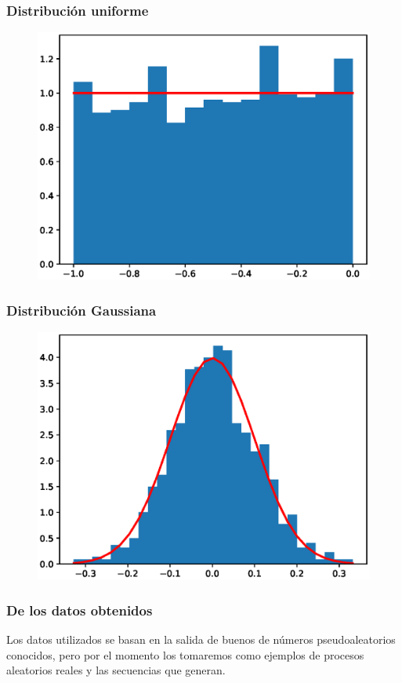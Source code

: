 \documentclass[12pt]{beamer}
\begin{document}
\begin{frame}
\frametitle{Distribución uniforme}
\begin{figure}
    \centering
    \includegraphics[scale=0.55]{Imagenes/plot_distribucion_02_uniforme.eps}
\end{figure}
\end{frame}
\begin{frame}
\frametitle{Distribución Gaussiana}
\begin{figure}
    \centering
    \includegraphics[scale=0.55]{Imagenes/plot_distribucion_03_gaussiana.eps}
\end{figure}
\end{frame}
\begin{frame}
\frametitle{De los datos obtenidos}
Los datos utilizados se basan en la salida de buenos  de números pseudoaleatorios conocidos, \pause pero por el momento los tomaremos como ejemplos de procesos aleatorios reales y las secuencias que generan.
\end{frame}
\end{document}
